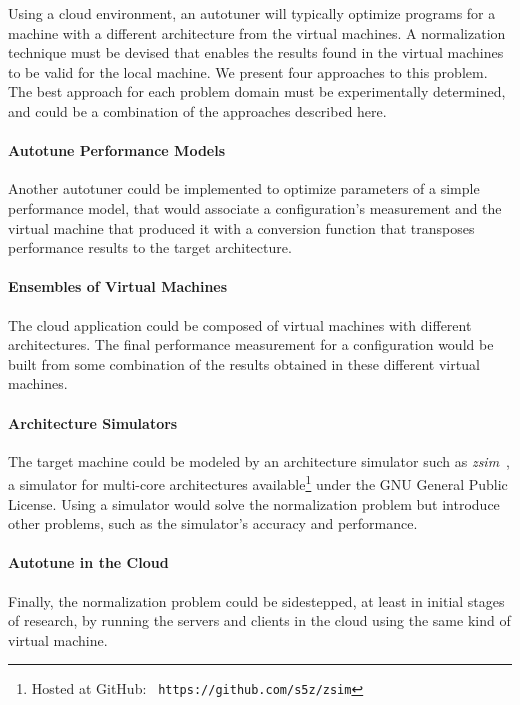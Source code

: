 \documentclass[a4paper, 12pt]{article}
\begin{document}

Using a cloud environment, an autotuner will typically optimize programs for
a machine with a different architecture from the virtual machines. A
normalization technique must be devised that enables the results found in the
virtual machines to be valid for the local machine.  We present four
approaches to this problem. The best approach for each problem domain
must be experimentally determined, and could be a combination of the approaches
described here.

\paragraph{Autotune Performance Models}
Another autotuner could be implemented to optimize parameters of a simple
performance model, that would associate a configuration's measurement and the
virtual machine that produced it with a conversion function that transposes
performance results to the target architecture.

\paragraph{Ensembles of Virtual Machines}
The cloud application could be composed of virtual machines with different
architectures. The final performance measurement for a configuration would be
built from some combination of the results obtained in these different virtual
machines.

\paragraph{Architecture Simulators}
The target machine could be modeled by an architecture simulator such as
\emph{zsim}~\cite{sanchez2013zsim}, a simulator for multi-core architectures
available\footnote{Hosted at GitHub: \texttt{\scriptsize
https://github.com/s5z/zsim}} under the GNU General Public License.  Using a
simulator would solve the normalization problem but introduce other problems,
such as the simulator's accuracy and performance.

\paragraph{Autotune in the Cloud}
Finally, the normalization problem could be sidestepped, at least in initial
stages of research, by running the servers and clients in the cloud using
the same kind of virtual machine.
\end{document}
